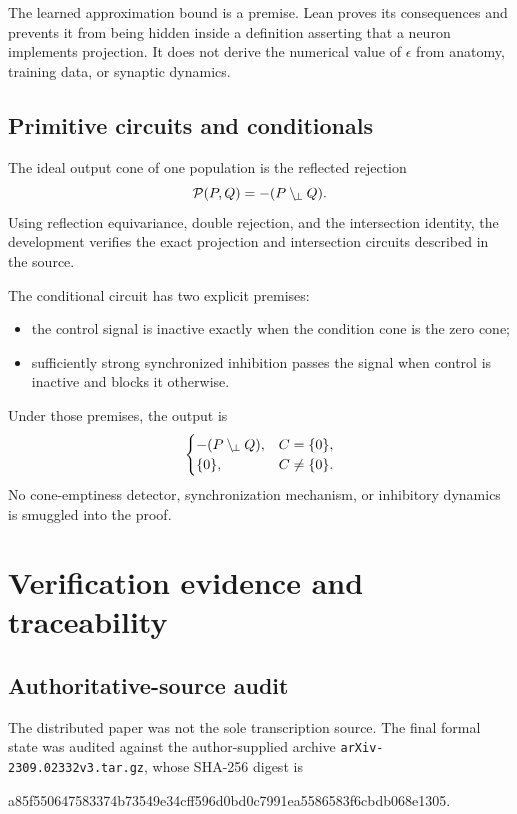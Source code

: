 \documentclass[11pt,a4paper]{article}
\begin{document}
\begin{boundarybox}
The learned approximation bound is a premise. Lean proves its consequences
and prevents it from being hidden inside a definition asserting that a
neuron implements projection. It does not derive the numerical value of
\(\epsilon\) from anatomy, training data, or synaptic dynamics.
\end{boundarybox}

\subsection{Primitive circuits and conditionals}

The ideal output cone of one population is the reflected rejection
\[
  \mathcal{P}(P,Q)=-(P\mathbin{\backslash_{\!\perp}} Q).
\]
Using reflection equivariance, double rejection, and the intersection
identity, the development verifies the exact projection and intersection
circuits described in the source.

The conditional circuit has two explicit premises:

\begin{itemize}
  \item the control signal is inactive exactly when the condition cone is the
    zero cone;
  \item sufficiently strong synchronized inhibition passes the signal when
    control is inactive and blocks it otherwise.
\end{itemize}

Under those premises, the output is
\[
  \begin{cases}
    -(P\mathbin{\backslash_{\!\perp}} Q),&C=\{0\},\\
    \{0\},&C\neq\{0\}.
  \end{cases}
\]
No cone-emptiness detector, synchronization mechanism, or inhibitory
dynamics is smuggled into the proof.

\section{Verification evidence and traceability}
\label{sec:evidence}

\subsection{Authoritative-source audit}

The distributed paper was not the sole transcription source. The final
formal state was audited against the author-supplied archive
\texttt{arXiv-2309.02332v3.tar.gz}, whose SHA-256 digest is
\begin{center}
\small\ttfamily
a85f550647583374b73549e34cff596d0bd0c7991ea5586583f6cbdb068e1305.
\end{center}
\end{document}
